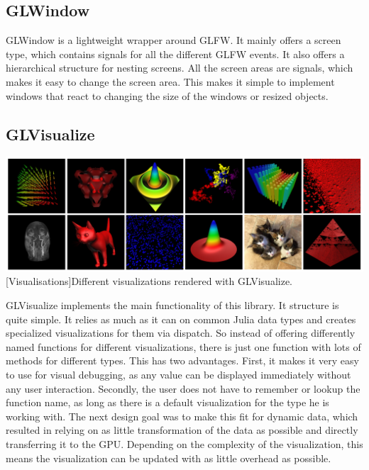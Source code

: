 \subsection{GLWindow}
GLWindow is a lightweight wrapper around GLFW.
It mainly offers a screen type, which contains signals for all the different GLFW events. 
It also offers a hierarchical structure for nesting screens.
All the screen areas are signals, which makes it easy to change the screen area. 
This makes it simple to implement windows that react to changing the size of the windows or resized objects.


\subsection{GLVisualize}

\vspace{1em}
\begin{minipage}{\linewidth}
    \centering
    \includegraphics[width=0.9\linewidth]{graphics/glvisualize.jpg}
    [Visualisations]{Different visualizations rendered with GLVisualize.}
    \label{fig:glvisualize}
\end{minipage}

GLVisualize implements the main functionality of this library.
It structure is quite simple. 
It relies as much as it can on common Julia data types and creates specialized visualizations for them via dispatch.
So instead of offering differently named functions for different visualizations, there is just one function with lots of methods for different types.
This has two advantages.
First, it makes it very easy to use for visual debugging, as any value can be displayed immediately without any user interaction.
Secondly, the user does not have to remember or lookup the function name, as long as there is a default visualization for the type he is working with.
The next design goal was to make this fit for dynamic data, which resulted in relying on as little transformation of the data as possible and directly transferring it to the GPU.
Depending on the complexity of the visualization, this means the visualization can be updated with as little overhead as possible.

